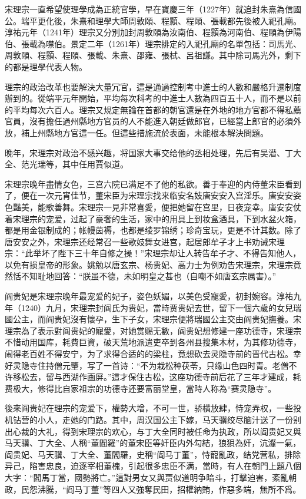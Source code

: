 宋理宗一直希望使理學成為正統官學，早在寶慶三年（1227年）就追封朱熹為信國公。端平更化後，朱熹和理學大師周敦頤、程顥、程頤、張載都先後被入祀孔廟。淳祐元年（1241年）理宗又分別加封周敦頤為汝南伯、程顥為河南伯、程頤為伊陽伯、張載為噤伯。景定二年（1261年）理宗排定的入祀孔廟的名單包括：司馬光、周敦頤、程顥、程頤、張載、朱熹、邵雍、張栻、呂祖謙。其中除司馬光外，剩下的都是理學代表人物。

理宗的政治改革也要解決大量冗官，這是通過控制考中進士的人數和嚴格升遷制度辦到的。從端平元年開始，平均每次科考的中進士人數為四百五十人，而不是以前的平均每次六百人。理宗又規定無論在首都的朝官還是在外地的地方官都不得私薦官員，沒有擔任過州縣地方官员的人不能進入朝廷做郎官，已經當上郎官的必須外放，補上州縣地方官這一任。但這些措施流於表面，未能根本解決問題。

晚年，宋理宗对政治不感兴趣，将国家大事交给他的丞相处理，先后有吴潜、丁大全、范光瑞等，其中任用賈似道。

宋理宗晚年盡情女色，三宫六院已满足不了他的私欲。善于奉迎的内侍董宋臣看到了，便在一次元宵佳节，董宋臣为宋理宗找来临安名妓唐安安入宫淫乐。唐安安姿色豔美，能歌善舞。宋理宗一見非常喜愛，便把她留在宫里，日夜宠幸。唐安安仗着宋理宗的宠爱，过起了豪奢的生活，家中的用具上到妆盒酒具，下到水盆火箱，都是用金银制成的；帐幔茵褥，也都是绫罗锦绣；珍奇宝玩，更是不计其数。除了唐安安之外，宋理宗还经常召一些歌妓舞女进宫，起居郎牟子才上书劝诫宋理宗：“此举坏了陛下三十年自修之操！”宋理宗却让人转告牟子才、不得告知他人，以免有损皇帝的形象。姚勉以唐玄宗、杨贵妃、高力士为例劝告宋理宗，宋理宗竟然恬不知耻地回答：“朕虽不德，未如明皇之甚也（自嘲不如唐玄宗厲害）。”

阎贵妃是宋理宗晚年最宠爱的妃子，姿色妖媚，以美色受寵愛，初封婉容。淳祐九年（1240）九月，宋理宗封阎氏为贵妃，當時贾贵妃去世，留下一個六歲的女兒瑞國公主，而阎贵妃沒有懷孕，生下子女，宋理宗便將瑞國公主交由阎贵妃撫養。宋理宗為了表示對阎贵妃的寵愛，对她赏赐无數，阎贵妃想修建一座功德寺，宋理宗不惜动用国库，耗費巨資，破天荒地派遣吏卒到各州县搜集木材，为其修功德寺，闹得老百姓不得安宁，为了求得合适的的梁柱，竟想砍去灵隐寺前的晋代古松。幸好灵隐寺住持僧元肇，写了一首诗：“不为栽松种茯苓，只缘山色四时青。老僧不许移松去，留与西湖作画屏。”這才保住古松，这座功德寺前后花了三年才建成，耗费极大，修得比自家祖宗的功德寺还要富丽堂皇，當時人称為“赛灵隐寺”。

後來阎贵妃在理宗的宠爱下，權勢大增，不可一世，骄横放肆，恃宠弄权，一些投机钻营的小人，走她的门路。其中，周汉国公主下嫁，马天骥绞尽脑汁送了一份别出心裁的大礼，得到宋理宗的欢心，与丁大全同时被任命为执政，所以阎贵妃又與马天骥、丁大全、人稱“董閻羅”的董宋臣等奸臣内外勾結，狼狽為奸，沆瀣一氣，阎贵妃、马天骥、丁大全、董閻羅，史稱“阎马丁董”，恃寵亂政，结党营私，排除异己，陷害忠良，迫逐宰相董槐，引起很多忠臣不满，當時，有人在朝門上題八個大字：“閻馬丁當，國勢將亡。”這對男女又與贾似道明争暗斗，打擊迫害，紊亂朝政，民怨沸騰，“阎马丁董”等四人又強奪民田，招權納賄，作惡多端，無所不爲。

